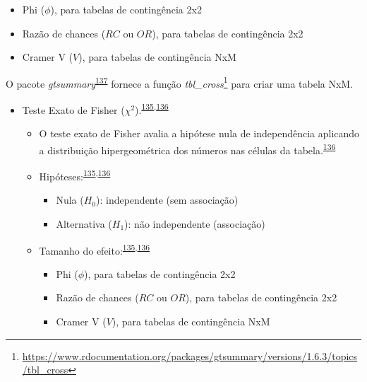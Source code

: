 \documentclass[
  a4paper,
]{book}
\renewcommand{\href}[2]{#2\footnote{\url{#1}}}
\newenvironment{infobox}[1]
  {
  \begin{itemize}
  \renewcommand{\labelitemi}{
    \raisebox{-.7\height}[0pt][0pt]{
      {\setkeys{Gin}{width=3em,keepaspectratio}
        \texttt{[image: \#1]}}
    }
  }
  \setlength{\fboxsep}{1em}
  \begin{blackbox}
  \item
  }
  {
  \end{blackbox}
  \end{itemize}
  }
\begin{document}
\begin{itemize}
\begin{itemize}
    \begin{itemize}
    \item
      Phi (\(\phi\)), para tabelas de contingência 2x2
    \item
      Razão de chances (\(RC\) ou \(OR\)), para tabelas de contingência 2x2
    \item
      Cramer V (\(V\)), para tabelas de contingência NxM
    \end{itemize}
  \end{itemize}
\end{itemize}

\begin{infobox}{images/Rlogo}
O pacote \emph{gtsummary}\textsuperscript{\protect\hyperlink{ref-gtsummary}{137}} fornece a função \href{https://www.rdocumentation.org/packages/gtsummary/versions/1.6.3/topics/tbl_cross}{\emph{tbl\_cross}} para criar uma tabela NxM.

\end{infobox}

\begin{itemize}
\item
  Teste Exato de Fisher (\(\chi^2\)).\textsuperscript{\protect\hyperlink{ref-McHugh2013}{135},\protect\hyperlink{ref-Kim2017a}{136}}

  \begin{itemize}
  \item
    O teste exato de Fisher avalia a hipótese nula de independência aplicando a distribuição hipergeométrica dos números nas células da tabela.\textsuperscript{\protect\hyperlink{ref-Kim2017a}{136}}
  \item
    Hipóteses:\textsuperscript{\protect\hyperlink{ref-McHugh2013}{135},\protect\hyperlink{ref-Kim2017a}{136}}

    \begin{itemize}
    \item
      Nula (\(H_{0}\)): independente (sem associação)
    \item
      Alternativa (\(H_{1}\)): não independente (associação)
    \end{itemize}
  \item
    Tamanho do efeito:\textsuperscript{\protect\hyperlink{ref-McHugh2013}{135},\protect\hyperlink{ref-Kim2017a}{136}}

    \begin{itemize}
    \item
      Phi (\(\phi\)), para tabelas de contingência 2x2
    \item
      Razão de chances (\(RC\) ou \(OR\)), para tabelas de contingência 2x2
    \item
      Cramer V (\(V\)), para tabelas de contingência NxM
    \end{itemize}
  \end{itemize}
\end{itemize}
\end{document}
